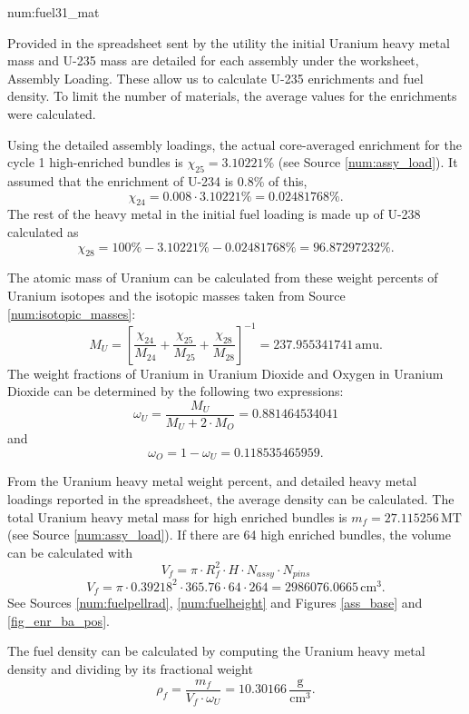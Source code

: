 \begin{numitem}{num:fuel31_mat}
  
   Provided in the spreadsheet sent by the utility the initial Uranium heavy metal mass and U-235 mass are detailed for each assembly under the worksheet, Assembly Loading. These allow us to calculate U-235 enrichments and fuel density. To limit the number of materials, the average values for the enrichments were calculated. 
   
   Using the detailed assembly loadings, the actual core-averaged enrichment for the cycle 1 high-enriched bundles is $\chi_{25} = 3.10221\%$ (see Source \ref{num:assy_load}). It assumed that the enrichment of U-234 is 0.8\% of this,
\[
    \chi_{24} = 0.008\cdot 3.10221\% = 0.02481768\%.
\]
    The rest of the heavy metal in the initial fuel loading is made up of U-238 calculated as
\[
    \chi_{28} = 100\% - 3.10221\% - 0.02481768\% = 96.87297232\%.
\]

The atomic mass of Uranium can be calculated from these weight percents of Uranium isotopes and the isotopic masses taken from Source \ref{num:isotopic_masses}:
\[
    M_U = \left[ \frac{\chi_{24}}{M_{24}} + \frac{\chi_{25}}{M_{25}} + \frac{\chi_{28}}{M_{28}} \right ]^{-1} = 237.955341741\,\mathrm{amu}. 
\]
The weight fractions of Uranium in Uranium Dioxide and Oxygen in Uranium Dioxide can be determined by the following two expressions:
\[
    \omega_{U} = \frac{M_U}{M_U + 2\cdot M_O} = 0.881464534041
\]
and
\[
    \omega_{O} = 1 - \omega_{U} = 0.118535465959. 
\]

From the Uranium heavy metal weight percent, and detailed heavy metal loadings reported in the spreadsheet, the average density can be calculated. The total Uranium heavy metal mass for high enriched bundles is $m_f = 27.115256\,\mathrm{MT}$ (see Source \ref{num:assy_load}).  If there are 64 high enriched bundles, the volume can be calculated with
\[
    V_f = \pi \cdot R_f^2 \cdot H \cdot N_{assy} \cdot N_{pins}
\]
\[
    V_f = \pi \cdot 0.39218^2 \cdot 365.76 \cdot 64 \cdot 264 = 2986076.0665\,\mathrm{cm^3}.
\]
See Sources \ref{num:fuelpellrad}, \ref{num:fuelheight} and Figures \ref{ass_base} and \ref{fig_enr_ba_pos}.

The fuel density can be calculated by computing the Uranium heavy metal density and dividing by its fractional weight
\[
    \rho_f = \frac{m_f}{V_f\cdot\omega_{U}} = 10.30166\,\mathrm{\frac{g}{cm^3}}.
\]


\end{numitem}
